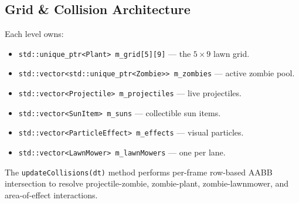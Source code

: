\documentclass[12pt,a4paper]{article}
\begin{document}
\subsection{Grid \& Collision Architecture}
Each level owns:
\begin{itemize}[leftmargin=2em]
    \item \texttt{std::unique\_ptr<Plant> m\_grid[5][9]} --- the $5 \times 9$ lawn grid.
    \item \texttt{std::vector<std::unique\_ptr<Zombie>{>} m\_zombies} --- active zombie pool.
    \item \texttt{std::vector<Projectile> m\_projectiles} --- live projectiles.
    \item \texttt{std::vector<SunItem> m\_suns} --- collectible sun items.
    \item \texttt{std::vector<ParticleEffect> m\_effects} --- visual particles.
    \item \texttt{std::vector<LawnMower> m\_lawnMowers} --- one per lane.
\end{itemize}
The \texttt{updateCollisions}\texttt{(dt)} method performs per-frame row-based AABB intersection to resolve projectile-zombie, zombie-plant, zombie-lawnmower, and area-of-effect interactions.
\end{document}

